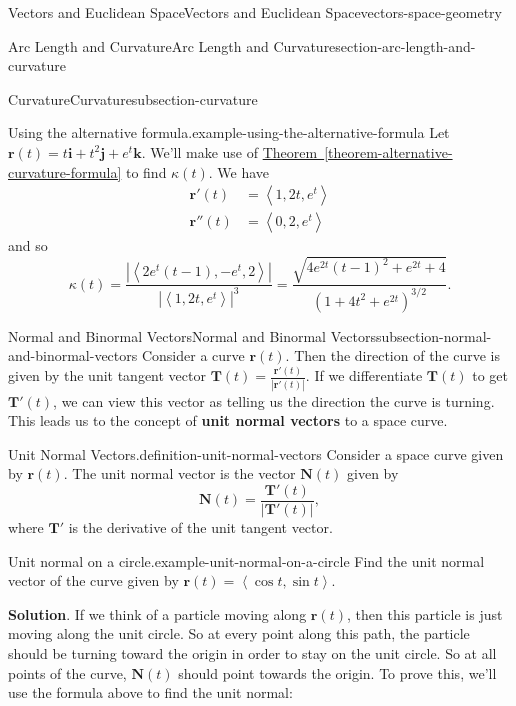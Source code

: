 \documentclass[oneside,10pt,]{book}
\newcommand{\terminology}[1]{\textbf{#1}}
\numberwithin{equation}{section}
\newcommand{\vv}[1]{\mathbf{#1}}
\newcommand{\dotprod}[1]{\left\langle #1 \right\rangle}
\begin{document}
\begin{chapterptx}{Vectors and Euclidean Space}{}{Vectors and Euclidean Space}{}{}{vectors-space-geometry}
\begin{sectionptx}{Arc Length and Curvature}{}{Arc Length and Curvature}{}{}{section-arc-length-and-curvature}
\begin{subsectionptx}{Curvature}{}{Curvature}{}{}{subsection-curvature}
\begin{example}{Using the alternative formula.}{example-using-the-alternative-formula}
\hypertarget{p-1296}{}%
Let \(\vv{r}(t) = t\vv{i}+t^{2}\vv{j}+e^{t}\vv{k}\). We'll make use of \hyperref[theorem-alternative-curvature-formula]{Theorem~\ref{theorem-alternative-curvature-formula}} to find \(\kappa(t).\) We have%
%
\begin{align*}
\vv{r}'(t) & = \dotprod{1,2t,e^{t}} \\
\vv{r}''(t) & = \dotprod{0,2,e^{t}} 
\end{align*}
\hypertarget{p-1297}{}%
and so%
%
\begin{equation*}
\kappa(t) = \frac{|\dotprod{2e^{t}(t-1),-e^{t},2}|}{|\dotprod{1,2t,e^{t}}|^{3}} = \frac{\sqrt{4e^{2t}(t-1)^{2}+e^{2t}+4}}{(1+4t^{2}+e^{2t})^{3/2}}.
\end{equation*}
\end{example}
\end{subsectionptx}
%
%
\typeout{************************************************}
\typeout{************************************************}
%
\begin{subsectionptx}{Normal and Binormal Vectors}{}{Normal and Binormal Vectors}{}{}{subsection-normal-and-binormal-vectors}
\hypertarget{p-1298}{}%
Consider a curve \(\vv{r}(t)\). Then the direction of the curve is given by the unit tangent vector \(\vv{T}(t) = \frac{\vv{r}'(t)}{|\vv{r}'(t)|}\). If we differentiate \(\vv{T}(t)\) to get \(\vv{T}'(t)\), we can view this vector as telling us the direction the curve is turning. This leads us to the concept of \terminology{unit normal vectors} to a space curve.%
\begin{definition}{Unit Normal Vectors.}{definition-unit-normal-vectors}%
\hypertarget{p-1299}{}%
Consider a space curve given by \(\vv{r}(t)\). The unit normal vector is the vector \(\vv{N}(t)\) given by%
%
\begin{equation*}
\vv{N}(t) = \frac{\vv{T}'(t)}{|\vv{T}'(t)|},
\end{equation*}
\hypertarget{p-1300}{}%
where \(\vv{T}'\) is the derivative of the unit tangent vector.%
\end{definition}
\begin{example}{Unit normal on a circle.}{example-unit-normal-on-a-circle}%
\hypertarget{p-1301}{}%
Find the unit normal vector of the curve given by \(\vv{r}(t) = \dotprod{\cos t,\sin t}\).%
\par\smallskip%
\noindent\textbf{Solution}.\hypertarget{solution-208}{}\quad%
\hypertarget{p-1302}{}%
If we think of a particle moving along \(\vv{r}(t)\), then this particle is just moving along the unit circle. So at every point along this path, the particle should be turning toward the origin in order to stay on the unit circle. So at all points of the curve, \(\vv{N}(t)\) should point towards the origin. To prove this, we'll use the formula above to find the unit normal:%

\end{example}
\end{subsectionptx}
\end{sectionptx}
\end{chapterptx}
\end{document}
